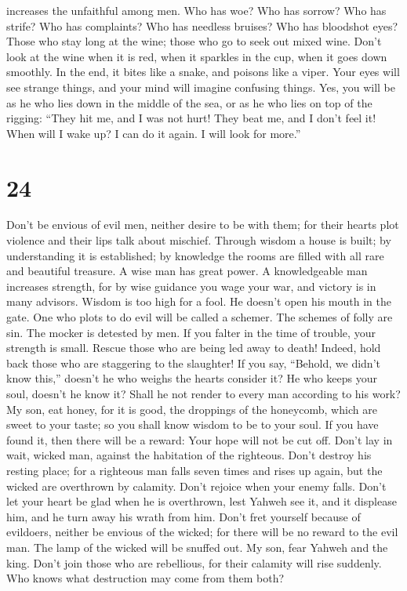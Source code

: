 increases the unfaithful among men.  Who has woe? Who has
sorrow? Who has strife? Who has complaints? Who has needless bruises?
Who has bloodshot eyes?  Those who stay long at the wine;
those who go to seek out mixed wine.  Don't look at the
wine when it is red, when it sparkles in the cup, when it goes down
smoothly.  In the end, it bites like a snake, and poisons
like a viper.  Your eyes will see strange things, and
your mind will imagine confusing things.  Yes, you will
be as he who lies down in the middle of the sea, or as he who lies on
top of the rigging:  ``They hit me, and I was not hurt!
They beat me, and I don't feel it! When will I wake up? I can do it
again. I will look for more.''

\hypertarget{section-23}{%
\section{24}\label{section-23}}

 Don't be envious of evil men, neither desire to be with
them;  for their hearts plot violence and their lips talk
about mischief.  Through wisdom a house is built; by
understanding it is established;  by knowledge the rooms
are filled with all rare and beautiful treasure.  A wise
man has great power. A knowledgeable man increases strength,
 for by wise guidance you wage your war, and victory is in
many advisors.  Wisdom is too high for a fool. He doesn't
open his mouth in the gate.  One who plots to do evil will
be called a schemer.  The schemes of folly are sin. The
mocker is detested by men.  If you falter in the time of
trouble, your strength is small.  Rescue those who are
being led away to death! Indeed, hold back those who are staggering to
the slaughter!  If you say, ``Behold, we didn't know
this,'' doesn't he who weighs the hearts consider it? He who keeps your
soul, doesn't he know it? Shall he not render to every man according to
his work?  My son, eat honey, for it is good, the
droppings of the honeycomb, which are sweet to your taste;
 so you shall know wisdom to be to your soul. If you have
found it, then there will be a reward: Your hope will not be cut off.
 Don't lay in wait, wicked man, against the habitation of
the righteous. Don't destroy his resting place;  for a
righteous man falls seven times and rises up again, but the wicked are
overthrown by calamity.  Don't rejoice when your enemy
falls. Don't let your heart be glad when he is overthrown,
 lest Yahweh see it, and it displease him, and he turn
away his wrath from him.  Don't fret yourself because of
evildoers, neither be envious of the wicked;  for there
will be no reward to the evil man. The lamp of the wicked will be
snuffed out.  My son, fear Yahweh and the king. Don't
join those who are rebellious,  for their calamity will
rise suddenly. Who knows what destruction may come from them both?

